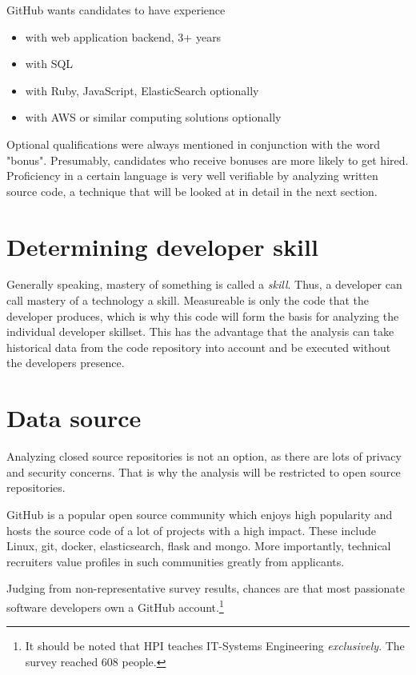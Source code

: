 GitHub wants candidates to have experience
\begin{itemize}
    \item with web application backend, 3+ years
    \item with SQL
    \item with Ruby, JavaScript, ElasticSearch optionally
    \item with AWS or similar computing solutions optionally
\end{itemize}

Optional qualifications were always mentioned in conjunction with the
word "bonus". Presumably, candidates who receive bonuses are more
likely to get hired. Proficiency in a certain language is very well
verifiable by analyzing written source code, a technique that will
be looked at in detail in the next section.

\section{Determining developer skill}
Generally speaking, mastery of something is called a \textit{skill}.
Thus, a developer can call mastery of a technology a skill.
Measureable is only the code that the developer produces, which
is why this code will form the basis for analyzing the individual
developer skillset. This has the advantage that the analysis
can take historical data from the code repository into account
and be executed without the developers presence.

\section{Data source}
Analyzing closed source repositories is not an option, as there are lots
of privacy and security concerns. That is why the analysis will be
restricted to open source repositories.
\newline

GitHub is a popular open source community which enjoys high popularity
and hosts the source code of a lot of projects with a high impact.
These include Linux, git, docker, elasticsearch, flask and mongo\cite{rpfd:2014}.
More importantly, technical recruiters value profiles in such communities
greatly from applicants\cite{md:2013}.


Judging from non-representative survey results, chances are that most
passionate software developers own a GitHub account.\footnote{It should be
noted that HPI teaches IT-Systems Engineering \textit{exclusively}. The
survey reached 608 people.}

